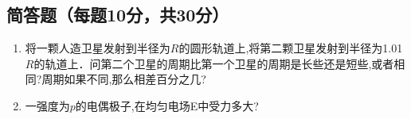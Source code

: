 
\subsection{ 简答题（每题10分，共30分）}
\begin{enumerate}
\item 将一颗人造卫星发射到半径为$R$的圆形轨道上,将第二颗卫星发射到半径为1.01$R$的轨道上．问第二个卫星的周期比第一个卫星的周期是长些还是短些,或者相同?周期如果不同,那么相差百分之几?
\item 一强度为$p$的电偶极子,在均匀电场E中受力多大?
\end{enumerate}